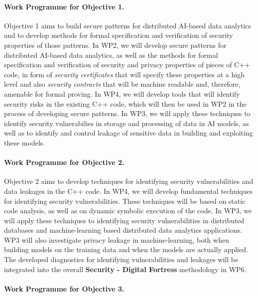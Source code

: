 \documentclass[a4paper,11pt]{article}
\newcommand{\project}[1]{\textbf{#1}\xspace}
\newcommand{\SECURITY}{\project{Security - Digital Fortress}}
\newcommand{\TheProject}{\SECURITY}
\begin{document}
\paragraph*{Work Programme for Objective 1.}

Objective 1 aims to build secure patterns for distributed AI-based data analytics and to develop methods for formal specification and verification of security properties of those patterns. In WP2, we will develop secure patterns for distributed AI-based data analytics, as well as the methods for formal specification and verification of security and privacy properties of pieces of C++ code, in form of \emph{security certificates} that will specify these properties at a high level and also \emph{security contracts} that will be machine readable and, therefore, amenable for formal proving. In WP4, we will develop tools that will identify security risks in the existing C++ code, which will then be used in WP2 in the process of developing secure patterns. In WP3, we will apply these techniques to identify security vulnerabilies in storage and processing of data in AI models, as well as to identify and control leakage of sensitive data in building and exploiting these models. 

\paragraph*{Work Programme for Objective 2.}

Objective 2 aims to develop techniques for identifying security vulnerabilities and data leakages in the C++ code. In WP4, we will develop fundamental techniques for identifying security vulnerabilities. These techniques will be based on static code analysis, as well as on dynamic symbolic execution of the code. In WP3, we will apply these techniques to identifying security vulnerabilities in distributed databases and machine-learning based distributed data analytics applications. WP3 will also investigate privacy leakage in machine-learning, both when building models on the training data and when the models are actually applied. The developed diagnostics for identifying vulnerabilities and leakages will be integrated into the overall \TheProject{} methodology in WP6.

\paragraph{Work Programme for Objective 3.}
\end{document}

